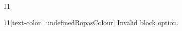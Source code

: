 \documentclass[paper=A4]{ropas-poster}
\begin{document}
\begin{postergrid}{1}{1}
\begin{posterblock}{1}{1}[text-color=undefinedRopasColour]
Invalid block option.
\end{posterblock}
\end{postergrid}
\end{document}
